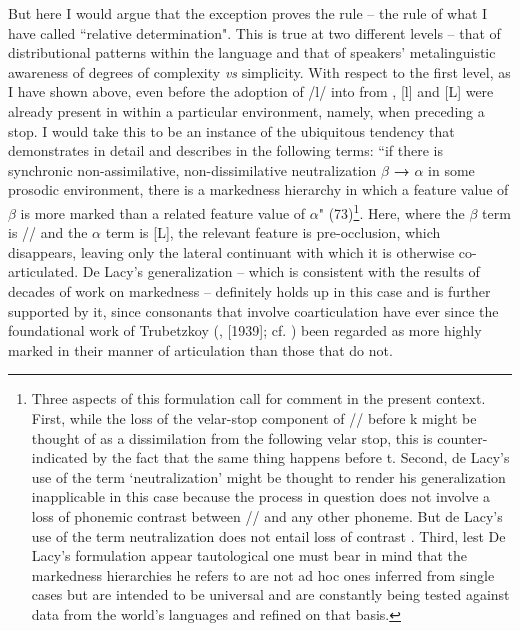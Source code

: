 \documentclass[output=paper]{langsci/langscibook}
\begin{document}
But here I would argue that the exception proves the rule – the rule of what I have called ``relative determination". This is true at two different levels – that of distributional patterns within the language and that of speakers’ metalinguistic awareness of degrees of complexity \textit{vs} simplicity. With respect to the first level, as I have shown above, even before the adoption of /l/ into  from , [l] and [L] were already present in  within a particular environment, namely, when preceding a stop.  I would take this to be an instance of the ubiquitous tendency that \citet{DeLacyMarkedness2006} demonstrates in detail and describes in the following terms: ``if there is synchronic non-assimilative, non-dissimilative neutralization $\beta$ \textbf{→} $\alpha$ in some prosodic environment, there is a markedness hierarchy  in which a feature value of $\beta$ is more marked than a related feature value of $\alpha$" (73)\footnote{Three aspects of this formulation call for comment in the present context. First, while the loss of the velar-stop component of /{\gL}/ before k might be thought of as a dissimilation from the following velar stop, this is counter-indicated by the fact that the same thing happens before t. Second, de Lacy’s use of the term ‘neutralization’ might be thought to render his generalization inapplicable in this case because the process in question does not involve a loss of phonemic contrast between /{\gL}/ and any other phoneme. But de Lacy’s use of the term neutralization does not entail loss of contrast \citep[110]{DeLacyMarkedness2006}. Third, lest De Lacy’s formulation appear tautological one must bear in mind that the markedness hierarchies he refers to are not ad hoc ones inferred from single cases but are intended to be universal and are constantly being tested against data from the world’s languages and refined on that basis.}. Here, where the $\beta $ term is /{\gL}/ and the $\alpha$ term is [L], the relevant feature is pre-occlusion, which disappears, leaving only the lateral continuant with which it is otherwise co-articulated. De Lacy’s generalization – which is consistent with the results of decades of work on markedness – definitely holds up in this case and is further supported by it, since consonants that involve coarticulation have ever since the foundational work of Trubetzkoy (\citeyear{Trubetskoy1931}, \citeyear{Trubetskoy1969}[1939]; cf. \citealt[42]{Baltaxe1978}) been regarded as more highly marked in their manner of articulation than those that do not.
\end{document}
